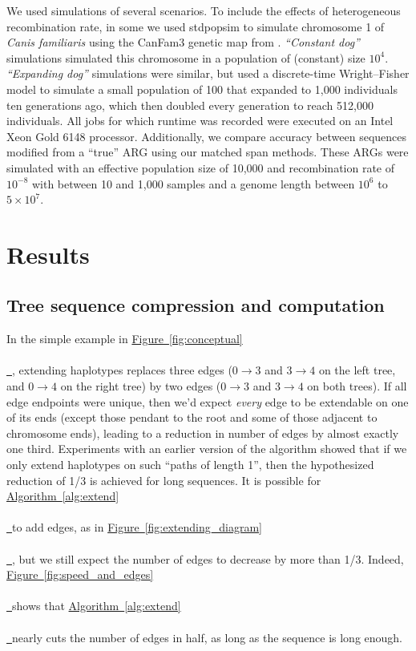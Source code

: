 \documentclass[10pt,twoside,lineno]{gsajnl}
\newcommand{\algorithmref}[2][]{%
	\hyperref[{#2}]{%
		Algorithm~\ref*{#2}%
		\ifx\\#1\\%
		\else
		\,#1%
		\fi
	}%
}
\newcommand*{\figref}[2][]{%
	\hyperref[{#2}]{%
		Figure~\ref*{#2}%
		\ifx\\#1\\%
		\else
		\,#1%
		\fi
	}%
}
\begin{document}
We used simulations of several scenarios.
To include the effects of heterogeneous recombination rate,
in some we used stdpopsim \citep{adrion2020stdpopsim} 
to simulate chromosome 1 of \textit{Canis familiaris}
using the CanFam3 genetic map from \citet{campbell2016}.
\emph{``Constant dog''} simulations simulated this chromosome in a 
population of (constant) size $10^4$.
\emph{``Expanding dog''} simulations were similar, but
used a discrete-time Wright--Fisher model to simulate
a small population of 100 that expanded to 1,000 individuals ten generations ago,
which then doubled every generation to reach 512,000 individuals.
All jobs for which runtime was recorded were executed on an Intel Xeon Gold 6148 processor.
Additionally, we compare accuracy between sequences modified from a ``true'' ARG
using our matched span methods. 
These ARGs were simulated with an effective population size of 10,000
and recombination rate of $10^{-8}$ with between 10 and 1,000 samples
and a genome length between $10^6$ to $5\times 10^7$.


\section{Results}

\subsection{Tree sequence compression and computation}


In the simple example in \figref{fig:conceptual},
extending haplotypes replaces three edges
($0 \to 3$ and $3 \to 4$ on the left tree, and $0 \to 4$ on the right tree)
by two edges ($0 \to 3$ and $3 \to 4$ on both trees).
If all edge endpoints were unique, then we'd expect \emph{every} edge to be extendable
on one of its ends
(except those pendant to the root and some of those adjacent to chromosome ends),
leading to a reduction in number of edges by almost exactly one third.
Experiments with an earlier version of the algorithm showed that
if we only extend haplotypes on such ``paths of length 1'', 
then the hypothesized reduction of 1/3 is achieved for long sequences.
It is possible for \algorithmref{alg:extend} to add edges, as in \figref{fig:extending_diagram},
but we still expect the number of edges to decrease by more than 1/3.
Indeed,
\figref{fig:speed_and_edges} shows that \algorithmref{alg:extend} nearly cuts the number of edges
in half, as long as the sequence is long enough.
\end{document}
